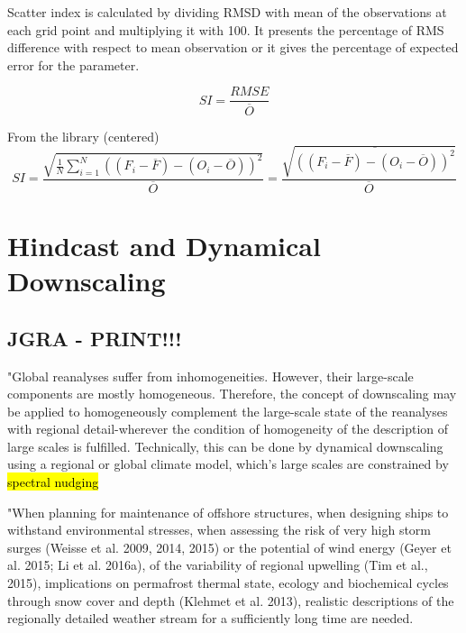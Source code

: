 \documentclass[12pt,a4paper]{article}
\begin{document}
Scatter index is calculated by dividing RMSD with mean of the observations at each grid point and multiplying it with 100. It presents the percentage of RMS difference with respect to mean observation or it gives the percentage of expected error for the parameter.

\begin{equation}
    SI = \frac{RMSE}{\overline{O}}
\end{equation}

From the library (centered)
\begin{equation}
    SI = {\frac { \sqrt { {\frac 1 N} { \sum_{i=1}^N {\left(\left(F_i-{\overline F}\right)-\left(O_i-{\overline O}\right)\right)^2}}} }{  \overline O} } =     \frac { \sqrt {  \overline { \left( (F_i-{\overline F})-( O_i-{\overline O}) \right)^2}}}{\overline{O}}
\end{equation}


\section{Hindcast and Dynamical Downscaling }

\subsection{\cite{VonStorch2017} JGRA - PRINT!!!}

"Global reanalyses suffer from inhomogeneities. However, their large-scale components are mostly homogeneous. Therefore, the concept of downscaling may be applied to homogeneously complement the large-scale state of the reanalyses with regional detail-wherever the condition of homogeneity of the description of large scales is fulfilled. Technically, this can be done by dynamical downscaling using a regional or global climate model, which's large scales are constrained by \hl{spectral nudging}

"When planning for maintenance of offshore structures, when designing ships to withstand environmental stresses, when assessing the risk of very high storm surges (Weisse et al. 2009, 2014, 2015) or the potential of wind energy (Geyer et al. 2015; Li et al. 2016a), of the variability of regional upwelling (Tim et al., 2015), implications on permafrost thermal state, ecology and biochemical cycles through snow cover and depth (Klehmet et al. 2013), realistic descriptions of the regionally detailed weather stream for a sufficiently long time are needed. 
\end{document}
